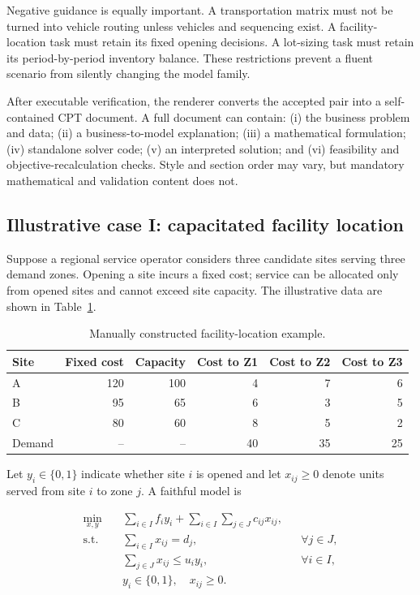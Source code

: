 Negative guidance is equally important.  A transportation matrix must not be
turned into vehicle routing unless vehicles and sequencing exist.  A facility-
location task must retain its fixed opening decisions.  A lot-sizing task must
retain its period-by-period inventory balance.  These restrictions prevent a
fluent scenario from silently changing the model family.

After executable verification, the renderer converts the accepted pair into a
self-contained CPT document.  A full document can contain: (i) the business
problem and data; (ii) a business-to-model explanation; (iii) a mathematical
formulation; (iv) standalone solver code; (v) an interpreted solution; and
(vi) feasibility and objective-recalculation checks.  Style and section order
may vary, but mandatory mathematical and validation content does not.

\subsection{Illustrative case I: capacitated facility location}
\label{app:orcpt-case-cflp}

Suppose a regional service operator considers three candidate sites serving
three demand zones.  Opening a site incurs a fixed cost; service can be allocated
only from opened sites and cannot exceed site capacity.  The illustrative data
are shown in Table~\ref{tab:orcpt-example-data}.

\begin{table}[H]
  \centering
  \caption{Manually constructed facility-location example.}
  \label{tab:orcpt-example-data}
  \small
  \begin{tabular}{@{}lrrrrr@{}}
    \toprule
    Site & Fixed cost & Capacity & Cost to Z1 & Cost to Z2 & Cost to Z3 \\
    \midrule
    A & 120 & 100 & 4 & 7 & 6 \\
    B &  95 &  65 & 6 & 3 & 5 \\
    C &  80 &  60 & 8 & 5 & 2 \\
    \midrule
    Demand & -- & -- & 40 & 35 & 25 \\
    \bottomrule
  \end{tabular}
\end{table}

Let $y_i\in\{0,1\}$ indicate whether site $i$ is opened and let
$x_{ij}\geq0$ denote units served from site $i$ to zone $j$.  A faithful model
is

\begin{align}
  \min_{x,y}\quad
    & \sum_{i\in I} f_i y_i
      + \sum_{i\in I}\sum_{j\in J} c_{ij}x_{ij},
      \label{eq:example-objective}\\
  \text{s.t.}\quad
    & \sum_{i\in I}x_{ij}=d_j,
      && \forall j\in J,\\
    & \sum_{j\in J}x_{ij}\leq u_i y_i,
      && \forall i\in I,\\
    & y_i\in\{0,1\},\quad x_{ij}\geq0.
\end{align}


